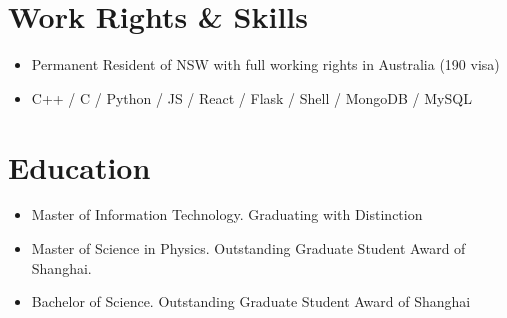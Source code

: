 \documentclass{resume}
\begin{document}


 
\section{Work Rights \& Skills}
\begin{itemize}
  \item Permanent Resident of NSW with full working rights in Australia (190 visa)
  \item C++ / C / Python / JS / React / Flask / Shell / MongoDB / MySQL
\end{itemize}

  

\section{Education}
\begin{itemize}
\item Master of Information Technology. Graduating with Distinction
\end{itemize}

\begin{itemize}
\item  Master of Science in Physics. Outstanding Graduate Student Award of Shanghai.
\end{itemize}

\begin{itemize}
\item Bachelor of Science. Outstanding Graduate Student Award of Shanghai 
\end{itemize}
\end{document}
